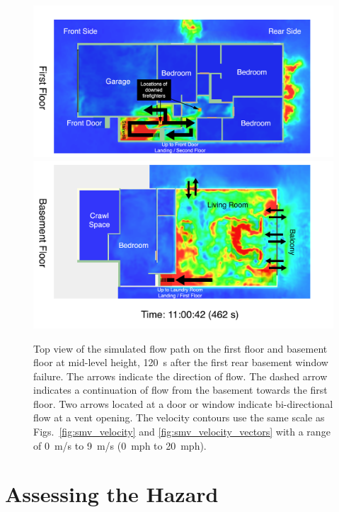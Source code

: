 \documentclass[12pt,oneside]{book}
\begin{document}
\begin{figure}[!ht]
\includegraphics[width=6.5in]{../Figures/Flow_Path_Top_Vel_462_s_First_Floor}
\includegraphics[width=6.5in]{../Figures/Flow_Path_Top_Vel_462_s_Basement_Floor}
\caption[Top view of the simulated flow path in the interior stairwell.]
{Top view of the simulated flow path on the first floor and basement floor at mid-level height, 120~s after the first rear basement window failure. The arrows indicate the direction of flow. The dashed arrow indicates a continuation of flow from the basement towards the first floor. Two arrows located at a door or window indicate bi-directional flow at a vent opening. The velocity contours use the same scale as Figs.~\ref{fig:smv_velocity} and \ref{fig:smv_velocity_vectors} with a range of 0~m/s to 9~m/s (0~mph to 20~mph).}
\label{fig:flow_path_top}
\end{figure}


\clearpage


\section{Assessing the Hazard}
\label{sec:assessing_the_hazard}
\end{document}
